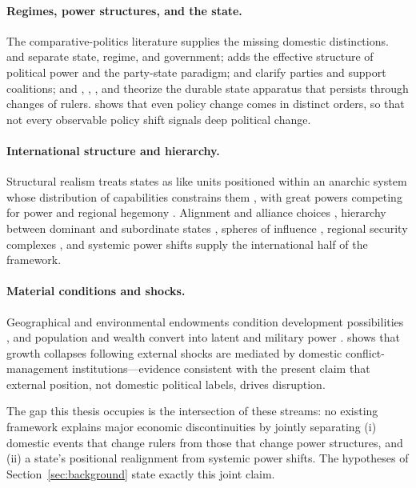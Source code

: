 \documentclass[11pt]{article}
\begin{document}
\paragraph{Regimes, power structures, and the state.} The comparative-politics literature supplies the missing domestic distinctions. \textcite{linz_stepan_1996} and \textcite{linz_2000} separate state, regime, and government; \textcite{garciatrevijano2010} adds the effective structure of political power and the party-state paradigm; \textcite{sartori_1976} and \textcite{bueno_de_mesquita_2003} clarify parties and support coalitions; and \textcite{weber1922wirtschaft}, \textcite{althusser_1971}, \textcite{tilly_1990}, and \textcite{skocpol_1979} theorize the durable state apparatus that persists through changes of rulers. \textcite{hall_1993} shows that even policy change comes in distinct orders, so that not every observable policy shift signals deep political change.

\paragraph{International structure and hierarchy.} Structural realism treats states as like units positioned within an anarchic system whose distribution of capabilities constrains them \parencite{waltz_1979}, with great powers competing for power and regional hegemony \parencite{mearsheimer_2001}. Alignment and alliance choices \parencite{walt_1987}, hierarchy between dominant and subordinate states \parencite{lake_2009}, spheres of influence \parencite{keal_1983,hast_2014}, regional security complexes \parencite{buzan_waever_2003}, and systemic power shifts \parencite{gilpin_1981} supply the international half of the framework.

\paragraph{Material conditions and shocks.} Geographical and environmental endowments condition development possibilities \parencite{diamond_1997}, and population and wealth convert into latent and military power \parencite{mearsheimer_2001}. \textcite{rodrik_1999} shows that growth collapses following external shocks are mediated by domestic conflict-management institutions---evidence consistent with the present claim that external position, not domestic political labels, drives disruption.

The gap this thesis occupies is the intersection of these streams: no existing framework explains major economic discontinuities by jointly separating (i) domestic events that change rulers from those that change power structures, and (ii) a state's positional realignment from systemic power shifts. The hypotheses of Section~\ref{sec:background} state exactly this joint claim.
\end{document}
